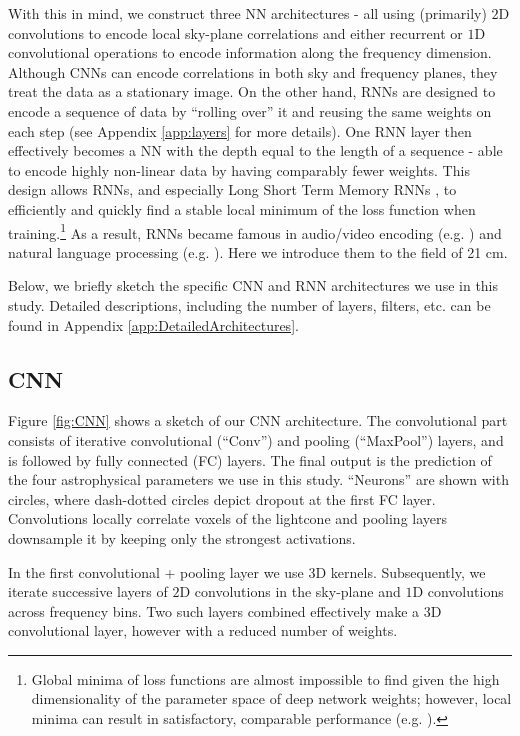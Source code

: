 \documentclass[fleqn,usenatbib]{mnras}
\begin{document}
With this in mind, we construct three NN architectures - all using (primarily) $2\mathrm{D}$ convolutions to encode local sky-plane correlations and either recurrent or $1\mathrm{D}$ convolutional operations to encode information along the frequency dimension.
Although CNNs can 
encode correlations in both sky and frequency planes, they treat the data as a stationary image. On the other hand, RNNs are designed to encode a sequence of data by \enquote{rolling over} it and reusing the same weights on each step (see Appendix \ref{app:layers} for more details). One RNN layer then effectively becomes a NN with the depth equal to the length of a sequence - able to encode highly non-linear data by having comparably fewer weights. This design allows RNNs, and especially Long Short Term Memory RNNs \citep{LSTM}, to efficiently and quickly find a stable local minimum of the loss function when training.\footnote{Global minima of loss functions are almost impossible to find given the high dimensionality of the parameter space of deep network weights; however, local minima can result in satisfactory, comparable performance (e.g. \citealt{choromanska2015}).} 
As a result, RNNs became famous in audio/video encoding (e.g. \citealt{ConvLSTM,zhao2019hierarchical}) and natural language processing (e.g. \citealt{aharoni2018gradual}). Here we introduce them to the field of 21 cm.

Below, we briefly sketch the specific CNN and RNN architectures we use in this study.  Detailed descriptions, including the number of layers, filters, etc. can be found in Appendix \ref{app:DetailedArchitectures}.

\subsection{CNN}
Figure \ref{fig:CNN} shows a sketch of our CNN architecture.  The convolutional part consists of iterative convolutional (\enquote{Conv}) and pooling (\enquote{MaxPool}) layers, and is followed by fully connected (FC) layers.  The final output is the prediction of the four astrophysical parameters we use in this study.  \enquote{Neurons} are shown with circles, where dash-dotted circles depict dropout at the first FC layer. Convolutions locally correlate voxels of the lightcone and pooling layers downsample it by keeping only the strongest activations.


In the first convolutional + pooling layer we use 3D kernels. Subsequently, we iterate successive layers of $2\mathrm{D}$ convolutions in the sky-plane and $1\mathrm{D}$ convolutions across frequency bins. Two such layers combined effectively make a $3\mathrm{D}$ convolutional layer, however with a reduced number of weights.
\end{document}
